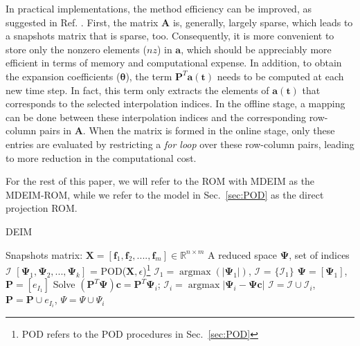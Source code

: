 \documentclass[review,number,sort&compress,12pt]{elsarticle}
\DeclareMathOperator{\argmaxH}{argmax}
\newcommand\abs[1]{\left|#1\right|}
\begin{document}
In practical implementations, the method efficiency can be improved, as suggested in Ref. \cite{negri2015efficient}.
First, the matrix $\mathbf{A}$ is, generally, largely sparse, which leads to a snapshots matrix that is sparse, too.
Consequently, it is more convenient to store only the nonzero elements ($nz$) in $\mathbf{a}$, 
which should be appreciably more efficient in terms of memory and computational expense.
In addition, to obtain the expansion coefficients ($\boldsymbol{\theta}$), the term $\mathbf{P}^T\mathbf{a(t)}$ needs to be computed at each new time step.
In fact, this term only extracts the elements of $\mathbf{a(t)}$ that corresponds to the selected  interpolation indices.
In the offline stage, a mapping can be done between these interpolation indices and the corresponding row-column pairs in $\mathbf{A}$.
When the matrix is formed in the online stage, only these entries are evaluated by restricting a \textit{for loop} over these row-column pairs, leading to more reduction in the computational cost.

For the rest of this paper, we will refer to the ROM with MDEIM as the MDEIM-ROM, while we refer to the model in Sec.~\ref{sec:POD} as the direct projection ROM.


\noindent\begin{minipage}{\textwidth}
	\renewcommand\footnoterule{}
	\begin{algorithm}[H]
		\caption{DEIM}
		\label{alg:DEIM}
		\begin{algorithmic}[1]
			\REQUIRE Snapshots matrix: $\mathbf{X} = [\mathbf{f}_1, \mathbf{f}_2,  ...., \mathbf{f}_m] \in \mathbb{R}^{n\times m}$
			\ENSURE A reduced space $\mathbf{\Psi}$, set of indices $\mathcal{I}$
			\STATE $[\mathbf{\Psi}_1, \mathbf{\Psi}_2, ..., \mathbf{\Psi}_k ]$ = POD(${\mathbf{X}}, \epsilon$)\footnote{POD refers to the POD procedures in Sec.~\ref{sec:POD}}
			\STATE $\mathcal{I}_1 = \argmaxH(\abs{\mathbf{\Psi}_1})$, $\mathcal{I}$ = $\{\mathcal{I}_1\}$
			\STATE $\mathbf{\Psi} = [\mathbf{\Psi}_1]$, $\mathbf{P} =[e_{I_1}]$
			\STATE Solve $(\mathbf{P}^T\mathbf{\Psi})\mathbf{c} = \mathbf{P}^T\mathbf{\Psi}_i$;
			\STATE $\mathcal{I}_i = \argmaxH{\abs{\mathbf{\Psi}_i - \mathbf{\Psi}\mathbf{c}}}$
			\STATE $\mathcal{I} = \mathcal{I} \cup \mathcal{I}_i$, $\mathbf{P} = \mathbf{P} \cup e_{I_i}$, ${\Psi = \Psi \cup \Psi_i}$
			\ENDFOR
		\end{algorithmic}
	\end{algorithm}
\end{minipage}
\end{document}
